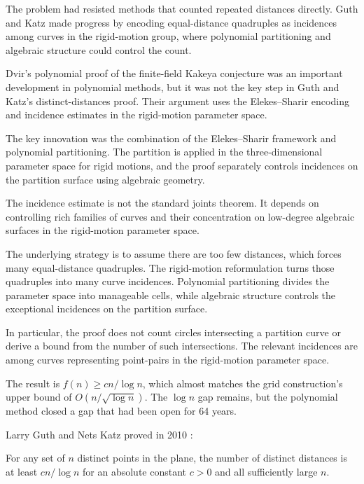 The problem had resisted methods that counted repeated distances directly. Guth and Katz made progress by encoding equal-distance quadruples as incidences among curves in the rigid-motion group, where polynomial partitioning and algebraic structure could control the count.

Dvir's polynomial proof of the finite-field Kakeya conjecture was an important development in polynomial methods, but it was not the key step in Guth and Katz's distinct-distances proof. Their argument uses the Elekes--Sharir encoding and incidence estimates in the rigid-motion parameter space.

The key innovation was the combination of the Elekes--Sharir framework and polynomial partitioning. The partition is applied in the three-dimensional parameter space for rigid motions, and the proof separately controls incidences on the partition surface using algebraic geometry.

The incidence estimate is not the standard joints theorem. It depends on controlling rich families of curves and their concentration on low-degree algebraic surfaces in the rigid-motion parameter space.

The underlying strategy is to assume there are too few distances, which forces many equal-distance quadruples. The rigid-motion reformulation turns those quadruples into many curve incidences. Polynomial partitioning divides the parameter space into manageable cells, while algebraic structure controls the exceptional incidences on the partition surface.

In particular, the proof does not count circles intersecting a partition curve or derive a bound from the number of such intersections. The relevant incidences are among curves representing point-pairs in the rigid-motion parameter space.

The result is $f(n) \ge cn/\log n$, which almost matches the grid construction's upper bound of $O(n/\sqrt{\log n})$. The $\log n$ gap remains, but the polynomial method closed a gap that had been open for 64 years.

Larry Guth and Nets Katz proved in 2010 \cite{guth2015}:

\begin{theorem}
For any set of $n$ distinct points in the plane, the number of distinct distances is at least $cn/\log n$ for an absolute constant $c>0$ and all sufficiently large $n$.
\end{theorem}

